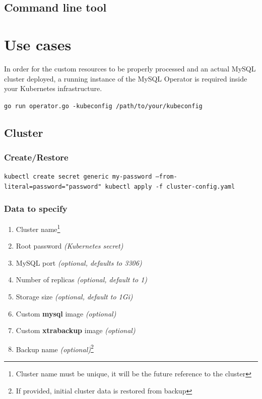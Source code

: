 \subsection{Command line tool}

\section{Use cases}
In order for the custom resources to be properly processed and an actual MySQL cluster deployed,
a running instance of the MySQL Operator is required inside your Kubernetes infrastructure.

\noindent \texttt{go run operator.go -kubeconfig /path/to/your/kubeconfig}

\subsection{Cluster}

\subsubsection{Create/Restore}
\texttt{kubectl create secret generic my-password --from-literal=password="password" \newline
kubectl apply -f cluster-config.yaml
}

\subsubsection{Data to specify}
\begin{enumerate}
	\item Cluster name\footnote{Cluster name must be unique, it will be the future reference
	to the cluster}
	\item Root password \textit{(Kubernetes secret)}
	\item MySQL port \textit{(optional, defaults to 3306)}
	\item Number of replicas \textit{(optional, default to 1)}
	\item Storage size \textit{(optional, default to 1Gi)}
	\item Custom \textbf{mysql} image \textit{(optional)}
	\item Custom \textbf{xtrabackup} image \textit{(optional)}
	\item Backup name \textit{(optional)}\footnote{If provided, initial cluster data is restored
	from backup}
\end{enumerate}


